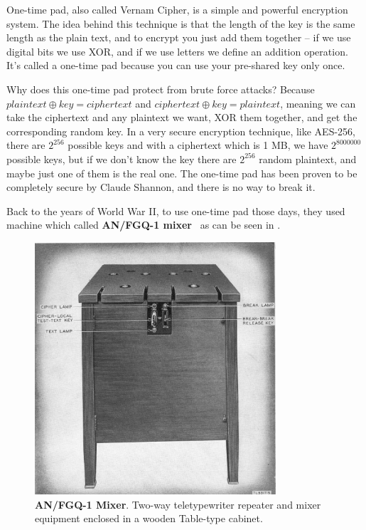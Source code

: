 One-time pad, also called Vernam Cipher, is a simple and powerful encryption system. The idea behind this technique is that the length of the key is the same length as the plain text, and to encrypt you just add them together – if we use digital bits we use XOR, and if we use letters we define an addition operation. It's called a one-time pad because you can use your pre-shared key only once.

Why does this one-time pad protect from brute force attacks? Because $plaintext \oplus key = ciphertext$ and $ciphertext \oplus key = plaintext$, meaning we can take the ciphertext and any plaintext we want, XOR them together, and get the corresponding random key. In a very secure encryption technique, like AES-256, there are \(2^{256}\) possible keys and with a ciphertext which is 1 MB, we have \(2^{8000000}\) possible keys, but if we don't know the key there are \(2^{256}\) random plaintext, and maybe just one of them is the real one. The one-time pad has been proven to be completely secure by Claude Shannon, and there is no way to break it.

Back to the years of World War II, to use one-time pad those days, they used machine which called \textbf{AN/FGQ-1 mixer}~\cite{cryptoMix} as can be seen in .

\begin{figure}[!ht]
    \centering
    \includegraphics[width=0.8\textwidth]{images/ch1_Intro/MIxer.jpg}
    \caption{\textbf{AN/FGQ-1 Mixer}. Two-way teletypewriter repeater and mixer equipment enclosed in a wooden Table-type cabinet.} \label{fig:Mixer}
\end{figure}

